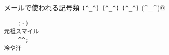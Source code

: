 \documentclass{jlreq}
\begin{document}
メールで使われる記号類 \verb|(^_^)| \verb/(^_^)/ \verb"(^_^)" \verb@(^_^)@
\begin{verbatim}
    :-)                                                                元祖スマイル
    ^^;                                                                冷や汗
\end{verbatim}
\end{document}
